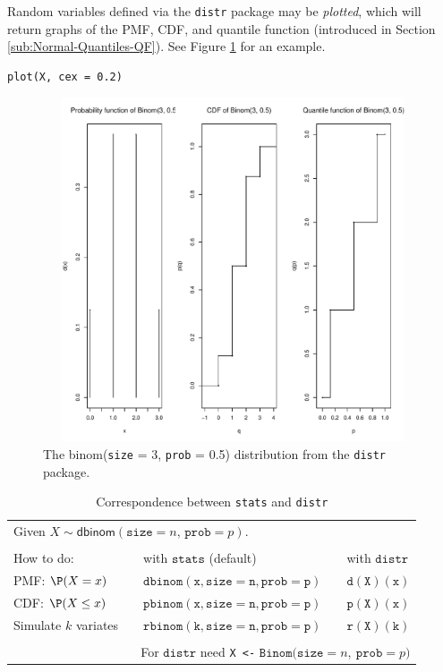 \documentclass[captions=tableheading]{scrbook}
\begin{document}
Random variables defined via the \texttt{distr} package may be \emph{plotted}, which will return graphs of the PMF, CDF, and quantile function (introduced in Section \ref{sub:Normal-Quantiles-QF}). See Figure \ref{fig:binom-plot-distr} for an example.



\begin{verbatim}
plot(X, cex = 0.2)
\end{verbatim}



\begin{figure}[th]
    \includegraphics[width=5in, height=4in]{img/binom-plot-distr.pdf}
    \caption[The \textsf{binom}(\texttt{size} = 3, \texttt{prob} = 0.5) distribution from the \texttt{distr} package]{\small The \textsf{binom}(\texttt{size} = 3, \texttt{prob} = 0.5) distribution from the \texttt{distr} package.}
    \label{fig:binom-plot-distr}
  \end{figure}

\begin{table}
\begin{tabular}{lllll}
\multicolumn{5}{l}{Given \(X\sim\mathsf{dbinom}(\mathtt{size}=n,\,\mathtt{prob}=p)\).}\tabularnewline
 &  &  &  & \tabularnewline
How to do: &  & with \(\mathtt{stats}\) (default)  &  & with \(\mathtt{distr}\)\tabularnewline
\hline
PMF: \(\P(X=x)\) &  & \(\mathtt{dbinom(x,size=n,prob=p)}\) &  & \(\mathtt{d(X)(x)}\)\tabularnewline
CDF: \(\P(X\leq x)\) &  & \(\mathtt{pbinom(x,size=n,prob=p)}\) &  & \(\mathtt{p(X)(x)}\)\tabularnewline
Simulate \(k\) variates &  & \(\mathtt{rbinom(k,size=n,prob=p)}\) &  & \(\mathtt{r(X)(k)}\)\tabularnewline
\hline
 &  &  &  & \tabularnewline
\multicolumn{5}{r}{For \(\mathtt{distr}\) need \texttt{X <-} \(\mathtt{Binom(size=}n\mathtt{,\ prob=}p\mathtt{)}\)}\tabularnewline
\end{tabular}
\caption{Correspondence between \texttt{stats} and \texttt{distr}}
\end{table}
\end{document}
